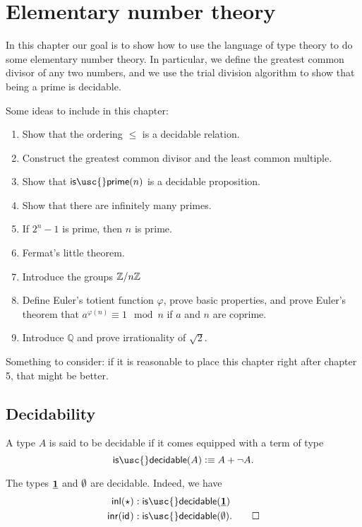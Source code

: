 \section{Elementary number theory}

In this chapter our goal is to show how to use the language of type theory to do some elementary number theory. In particular, we define the greatest common divisor of any two numbers, and we use the trial division algorithm to show that being a prime is decidable.

Some ideas to include in this chapter:
\begin{enumerate}
\item Show that the ordering $\leq$ is a decidable relation.
\item Construct the greatest common divisor and the least common multiple.
\item Show that $\mathsf{is\usc{}prime}(n)$ is a decidable proposition.
\item Show that there are infinitely many primes.
\item If $2^n-1$ is prime, then $n$ is prime.
\item Fermat's little theorem.
\item Introduce the groups $\mathbb{Z}/n\mathbb{Z}$
\item Define Euler's totient function $\varphi$, prove basic properties, and prove Euler's theorem that $a^{\varphi(n)}\equiv 1 \mod n$ if $a$ and $n$ are coprime.
\item Introduce $\mathbb{Q}$ and prove irrationality of $\sqrt{2}$.
\end{enumerate}

Something to consider: if it is reasonable to place this chapter right after chapter 5, that might be better.


\subsection{Decidability}

\begin{defn}
  A type $A$ is said to be decidable if it comes equipped with a term of type
  \begin{equation*}
    \mathsf{is\usc{}decidable}(A)\defeq A+\neg A.
  \end{equation*}
\end{defn}

\begin{eg}
  The types $\underline{\mathbf{1}}$ and $\emptyset$ are decidable. Indeed, we have
  \begin{align*}
    \inl(\ttt) & :\mathsf{is\usc{}decidable}(\unit) \\
    \inr(\idfunc) & : \mathsf{is\usc{}decidable}(\emptyt).\qedhere
  \end{align*}
\end{eg}


